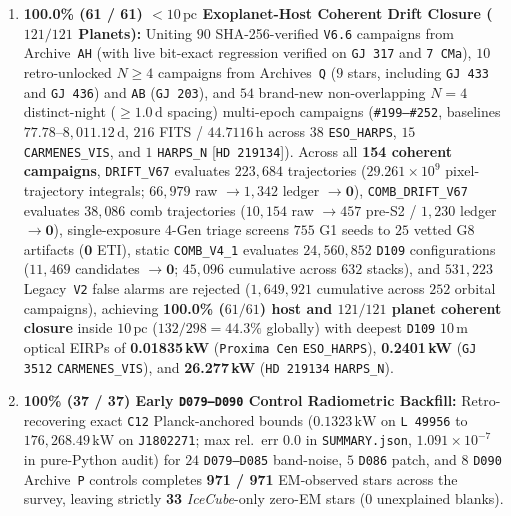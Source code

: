 \documentclass[twocolumn,10pt]{article}
\begin{document}
\begin{enumerate}
  \item \textbf{100.0\% (61 / 61) $<10\,\text{pc}$ Exoplanet-Host Coherent Drift Closure ($121 / 121$ Planets):} Uniting $90$ SHA-256-verified \texttt{V6.6} campaigns from Archive~\texttt{AH} (with live bit-exact regression verified on \texttt{GJ\,317} and \texttt{7\,CMa}), $10$ retro-unlocked $N\ge 4$ campaigns from Archives~\texttt{Q} ($9$ stars, including \texttt{GJ\,433} and \texttt{GJ\,436}) and \texttt{AB} (\texttt{GJ\,203}), and $54$ brand-new non-overlapping $N=4$ distinct-night ($\ge 1.0\,\text{d}$ spacing) multi-epoch campaigns (\texttt{\#199--\#252}, baselines $77.78\text{--}8{,}011.12\,\text{d}$, $216$ FITS / $44.7116\,\text{h}$ across $38$ \texttt{ESO\_HARPS}, $15$ \texttt{CARMENES\_VIS}, and $1$ \texttt{HARPS\_N} [\texttt{HD\,219134}]). Across all \textbf{154 coherent campaigns}, \texttt{DRIFT\_V67} evaluates $223{,}684$ trajectories ($29.261\times 10^9$ pixel-trajectory integrals; $66{,}979$ raw $\rightarrow 1{,}342$ ledger $\rightarrow \mathbf{0}$), \texttt{COMB\_DRIFT\_V67} evaluates $38{,}086$ comb trajectories ($10{,}154$ raw $\rightarrow 457$ pre-S2 / $1{,}230$ ledger $\rightarrow \mathbf{0}$), single-exposure 4-Gen triage screens $755$ G1 seeds to $25$ vetted G8 artifacts ($\mathbf{0}$ ETI), static \texttt{COMB\_V4\_1} evaluates $24{,}560{,}852$ \texttt{D109} configurations ($11{,}469$ candidates $\rightarrow \mathbf{0}$; $45{,}096$ cumulative across $632$ stacks), and $531{,}223$ Legacy~\texttt{V2} false alarms are rejected ($1{,}649{,}921$ cumulative across $252$ orbital campaigns), achieving \textbf{100.0\% ($61/61$) host and $121/121$ planet coherent closure} inside $10\,\text{pc}$ ($132/298 = 44.3\%$ globally) with deepest \texttt{D109} $10\,\text{m}$ optical EIRPs of \textbf{0.01835\,kW} (\texttt{Proxima\,Cen} \texttt{ESO\_HARPS}), \textbf{0.2401\,kW} (\texttt{GJ\,3512} \texttt{CARMENES\_VIS}), and \textbf{26.277\,kW} (\texttt{HD\,219134} \texttt{HARPS\_N}).
  \item \textbf{100\% (37 / 37) Early \texttt{D079--D090} Control Radiometric Backfill:} Retro-recovering exact \texttt{C12} Planck-anchored bounds ($0.1323\,\text{kW}$ on \texttt{L\,49956} to $176{,}268.49\,\text{kW}$ on \texttt{J1802271}; max rel.\ err $0.0$ in \texttt{SUMMARY.json}, $1.091\times 10^{-7}$ in pure-Python audit) for $24$ \texttt{D079--D085} band-noise, $5$ \texttt{D086} patch, and $8$ \texttt{D090} Archive~\texttt{P} controls completes \textbf{971 / 971} EM-observed stars across the survey, leaving strictly \textbf{33} \textit{IceCube}-only zero-EM stars ($0$ unexplained blanks).

\end{enumerate}
\end{document}
